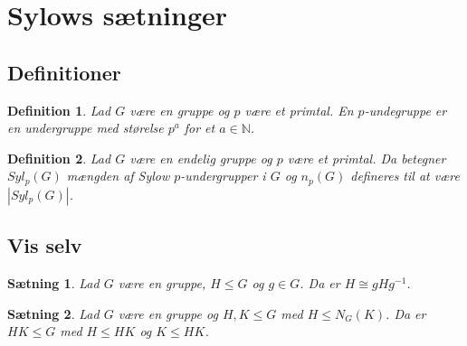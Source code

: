 \documentclass{article}
\newcommand{\N}{\mathbb{N}}
\newcommand{\inv}{^{-1}}
\newtheorem{setn}{Sætning}
\newtheorem{defi}{Definition}
\begin{document}
	\section*{Sylows sætninger}
		\subsection*{Definitioner}
		\begin{defi}
			Lad $G$ være en gruppe og $p$ være et primtal. En $p$-undegruppe er en undergruppe
			med størelse $p^a$ for et $a \in \N$.
		\end{defi}
		\begin{defi}
			Lad $G$ være en endelig gruppe og $p$ være et primtal. Da betegner $Syl_p(G)$ mængden
			af Sylow $p$-undergrupper i $G$ og $n_p(G)$ defineres til at være $|Syl_p(G)|$.
		\end{defi}
		\subsection*{Vis selv}
		\begin{setn}
			Lad $G$ være en gruppe, $H \le G$ og $g \in G$. Da er $H \cong gHg\inv$.
		\end{setn}
		\begin{setn} \label{HKGrup}
			Lad $G$ være en gruppe og $H,K \le G$ med $H \le N_G(K)$. Da er $HK \le G$ med
			$H \le HK$ og $K \le HK$.
		\end{setn}
\end{document}
